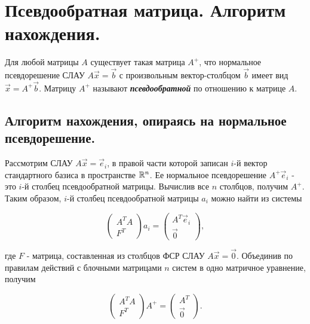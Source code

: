 \section{
    Псевдообратная матрица. Алгоритм нахождения.
}

\begin{definition}
    Для любой матрицы $A$ существует такая матрица $A^+$, что нормальное псевдорешение СЛАУ $A\vec{x} = \vec{b}$ с произвольным вектор-столбцом $\vec{b}$ имеет вид $\vec{x} = A^+\vec{b}$. Матрицу $A^+$ называют \textit{\textbf{псевдообратной}} по отношению к матрице $A$.
\end{definition}

\subsection{
    Алгоритм нахождения, опираясь на нормальное псевдорешение.
}

Рассмотрим СЛАУ $A\vec{x} = \vec{e}_i$, в правой части которой записан $i$-й вектор стандартного базиса в пространстве $\mathbb{R}^n$. Ее нормальное псевдорешение $A^+\vec{e}_i$ - это $i$-й столбец псевдообратной матрицы. Вычислив все $n$ столбцов, получим $A^+$. Таким образом, $i$-й столбец псевдообратной матрицы $a_i$ можно найти из системы

\begin{equation*}
    \left(\begin{array}{c}
        A^TA \\
        F^T
    \end{array}\right)a_i
    =
    \left(\begin{array}{c}
        A^T\vec{e}_i \\
        \vec{0}
    \end{array}\right)
,\end{equation*}

где $F$ - матрица, составленная из столбцов ФСР СЛАУ $A\vec{x} = \vec{0}$. Объединив по правилам действий с блочными матрицами $n$ систем в одно матричное уравнение, получим

\begin{equation*}
    \left(\begin{array}{c}
        A^TA \\
        F^T
    \end{array}\right)A^+
    =
    \left(\begin{array}{c}
        A^T \\
        \vec{0}
    \end{array}\right)
.\end{equation*}

